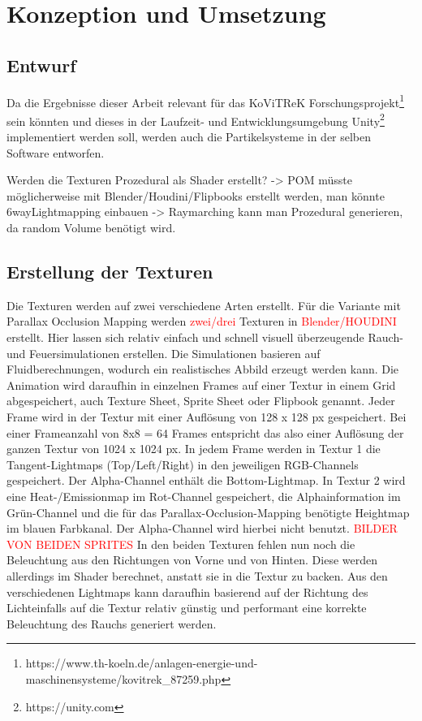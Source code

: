 \section{Konzeption und Umsetzung}
\label{sec:4}
\subsection{Entwurf}

Da die Ergebnisse dieser Arbeit relevant für das KoViTReK Forschungsprojekt\footnote{https://www.th-koeln.de/anlagen-energie-und-maschinensysteme/kovitrek_87259.php} 
sein könnten und dieses in der Laufzeit- und Entwicklungsumgebung Unity\footnote{https://unity.com} 
implementiert werden soll, werden auch die Partikelsysteme in der selben Software entworfen. 

Werden die Texturen Prozedural als Shader erstellt? 
-> POM müsste möglicherweise mit Blender/Houdini/Flipbooks erstellt werden, man könnte 6wayLightmapping einbauen
-> Raymarching kann man Prozedural generieren, da random Volume benötigt wird.



\subsection{Erstellung der Texturen}
\label{sec:4.1}

Die Texturen werden auf zwei verschiedene Arten erstellt. Für die Variante mit Parallax Occlusion Mapping werden \textcolor{red}{zwei/drei} 
Texturen in \textcolor{red}{Blender/HOUDINI} erstellt. Hier lassen sich relativ einfach und schnell visuell überzeugende Rauch- und 
Feuersimulationen erstellen. Die Simulationen basieren auf Fluidberechnungen, wodurch ein realistisches Abbild erzeugt werden kann. 
Die Animation wird daraufhin in einzelnen Frames auf einer Textur in einem Grid abgespeichert, auch Texture Sheet, Sprite Sheet oder Flipbook genannt.
Jeder Frame wird in der Textur mit einer Auflösung von 128 x 128 px gespeichert. Bei einer Frameanzahl von 8x8 = 64 Frames entspricht das also
einer Auflösung der ganzen Textur von 1024 x 1024 px.
In jedem Frame werden in Textur 1 die Tangent-Lightmaps (Top/Left/Right) in den jeweiligen RGB-Channels gespeichert. 
Der Alpha-Channel enthält die Bottom-Lightmap. In Textur 2 wird eine Heat-/Emissionmap im Rot-Channel gespeichert, die Alphainformation im 
Grün-Channel und die für das Parallax-Occlusion-Mapping benötigte Heightmap im blauen Farbkanal. Der Alpha-Channel wird hierbei nicht benutzt.
\textcolor{red}{BILDER VON BEIDEN SPRITES} 
In den beiden Texturen fehlen nun noch die Beleuchtung aus den Richtungen von Vorne und von Hinten. Diese werden allerdings im Shader 
berechnet, anstatt sie in die Textur zu backen. Aus den verschiedenen Lightmaps kann daraufhin basierend auf der Richtung des Lichteinfalls 
auf die Textur relativ günstig und performant eine korrekte Beleuchtung des Rauchs generiert werden. 

